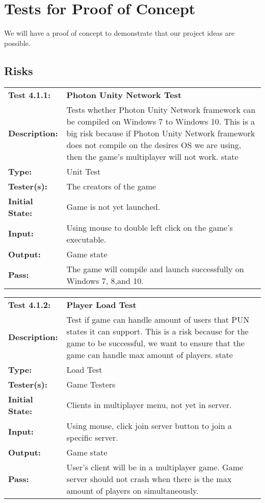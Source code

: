 \documentclass[12pt, titlepage]{article}
\begin{document}
\newpage
\section{Tests for Proof of Concept}
We will have a proof of concept to demonstrate that our project ideas are possible.
\subsection{Risks}

\begin{mdframed}[linewidth=1pt]
\begin{tabularx}{\textwidth}{@{}p{3cm}X@{}}
{\bf Test 4.1.1:} & {\bf Photon Unity Network Test}\\[\baselineskip]
{\bf Description:} & Tests whether Photon Unity Network framework can be compiled on Windows 7 to Windows 10. This is a big risk because if Photon Unity Network framework does not compile on the desires OS we are using, then the game's multiplayer will not work. state\\[0.5\baselineskip]
{\bf Type:} & Unit Test\\[0.5\baselineskip]
{\bf Tester(s):} & The creators of the game\\[0.5\baselineskip]
{\bf Initial State:} & Game is not yet launched.\\[0.5\baselineskip]
{\bf Input:} & Using mouse to double left click on the game's executable.\\[0.5\baselineskip]
{\bf Output:} & Game state\\[0.5\baselineskip]
{\bf Pass:} & The game will compile and launch successfully on Windows 7, 8,and 10.
\end{tabularx}
\end{mdframed}

\begin{mdframed}[linewidth=1pt]
\begin{tabularx}{\textwidth}{@{}p{3cm}X@{}}
{\bf Test 4.1.2:} & {\bf Player Load Test}\\[\baselineskip]
{\bf Description:} & Test if game can handle amount of users that PUN states it can support. This is a risk because for the game to be successful, we want to ensure that the game can handle max amount of players. state\\[0.5\baselineskip]
{\bf Type:} & Load Test\\[0.5\baselineskip]
{\bf Tester(s):} & Game Testers\\[0.5\baselineskip]
{\bf Initial State:} & Clients in multiplayer menu, not yet in server.\\[0.5\baselineskip]
{\bf Input:} & Using mouse, click join server button to join a specific server.\\[0.5\baselineskip]
{\bf Output:} & Game state\\[0.5\baselineskip]
{\bf Pass:} & User's client will be in a multiplayer game. Game server should not crash when there is the max amount of players on simultaneously.
\end{tabularx}
\end{mdframed}
\end{document}
